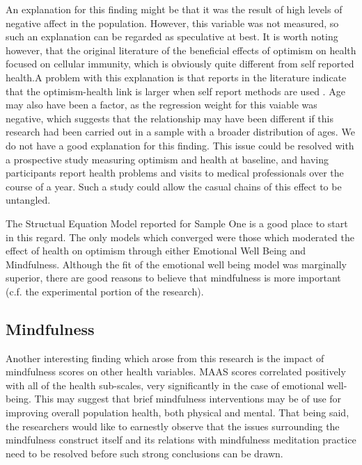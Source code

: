 \documentclass{article}
\begin{document}
An explanation for this finding might be that it was the result
of high levels of negative affect in the population.  However, this
variable was not measured, so such an explanation can be regarded
as speculative at best.  It is worth noting however, that the original
literature of the beneficial effects of optimism on health focused
on cellular immunity, which is obviously quite different from self
reported health.A problem with this explanation is that reports in the
literature indicate that the optimism-health link is larger when self
report methods are used \cite{rasmussen2009optimism}.  Age may also
have been a factor, as the regression weight for this vaiable was
negative, which suggests that the relationship may have been different
if this research had been carried out in a sample with a broader distribution
of ages.  We do not have a good explanation for this finding.
This issue could be resolved with a prospective study
measuring optimism and health at baseline, and having participants
report health problems and visits to medical professionals over the
course of a year.  Such a study could allow the casual chains of this
effect to be untangled.

The Structual Equation Model reported for Sample One is a good place to start in this regard.
The only models which converged were those which moderated the effect of health on optimism 
through either Emotional Well Being and Mindfulness. Although the fit of the emotional well being 
model was marginally superior, there are good reasons to believe that mindfulness is more 
important (c.f. the experimental portion of the research). 


\subsection{Mindfulness}
\label{sec:mindfulness}

Another interesting finding which arose from this research is the
impact of mindfulness scores on other health variables.  MAAS scores
correlated positively with all of the health sub-scales, very significantly
in the case of emotional well-being.  This may suggest that brief mindfulness
interventions may be of use for improving overall population health,
both physical and mental.  That being said, the researchers would like
to earnestly observe that the issues surrounding the mindfulness construct
itself and its relations with mindfulness meditation practice need
to be resolved before such strong conclusions can be drawn.
\end{document}
